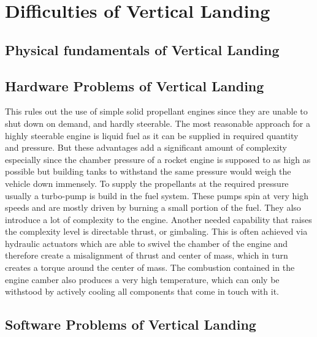 \section{Difficulties of Vertical Landing}

\subsection{Physical fundamentals of Vertical Landing}


\subsection{Hardware Problems of Vertical Landing}

This rules out the use of simple solid propellant engines since they are unable to shut down on demand, and hardly steerable. The most reasonable approach for a highly steerable engine is liquid fuel as it can be supplied in required quantity and pressure. But these advantages add a significant amount of complexity especially since the chamber pressure of a rocket engine is supposed to as high as possible but building tanks to withstand the same pressure would weigh the vehicle down immensely. To supply the propellants at the required pressure usually a turbo-pump is build in the fuel system. These pumps spin at very high speeds and are mostly driven by burning a small portion of the fuel. They also introduce a lot of complexity to the engine. Another needed capability that raises the complexity level is directable thrust, or gimbaling. This is often achieved via hydraulic actuators which are able to swivel the chamber of the engine and therefore create a misalignment of thrust and center of mass, which in turn creates a torque around the center of mass. The combustion contained in the engine camber also produces a very high temperature, which can only be withstood by actively cooling all components that come in touch with it.


\subsection{Software Problems of Vertical Landing}

